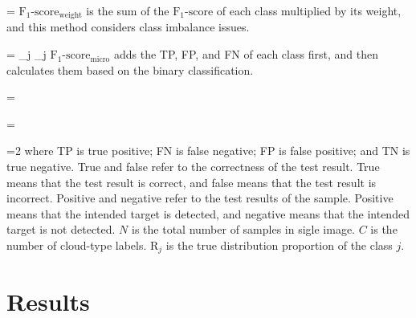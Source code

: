 \documentclass[review]{elsarticle}
\let\oldequation\equation
\let\oldendequation\endequation
\renewenvironment{equation}{\linenomathNonumbers\oldequation}{\oldendequation\endlinenomath}
\begin{document}
\begin{equation}
    \label{eq:F1-score_macro}
     =
\end{equation}
$\mathrm{F_{1}\mbox{-}score_{weight}}$ is the sum of the $\mathrm{F_{1}\mbox{-}score}$ of each class multiplied by its weight, and this method considers class imbalance issues.

\begin{equation}
    \label{eq:F1-score_weight}
      =  _{j}\times {} _{j}
\end{equation}
$\mathrm{F_{1}\mbox{-}score_{micro}}$ adds the TP, FP, and FN of each class first, and then calculates them based on the binary classification.

\begin{equation}
    \label{eq:Recall_m}
      = 
\end{equation}

\begin{equation}
    \label{eq:Precision_m}
     = 
\end{equation}

\begin{equation}
    \label{eq:F1-score_micro}
     =2
\end{equation}
where TP is true positive; FN is false negative; FP is false positive; and TN is true negative.
True and false refer to the correctness of the test result.
True means that the test result is correct, and false means that the test result is incorrect.
Positive and negative refer to the test results of the sample.
Positive means that the intended target is detected, and negative means that the intended target is not detected.
$N$ is the total number of samples in sigle image.
$C$ is the number of cloud-type labels.
$\mathrm{R}_{j}$ is the true distribution proportion of the class $j$.


\section{Results}
\label{section:Results}
\end{document}
